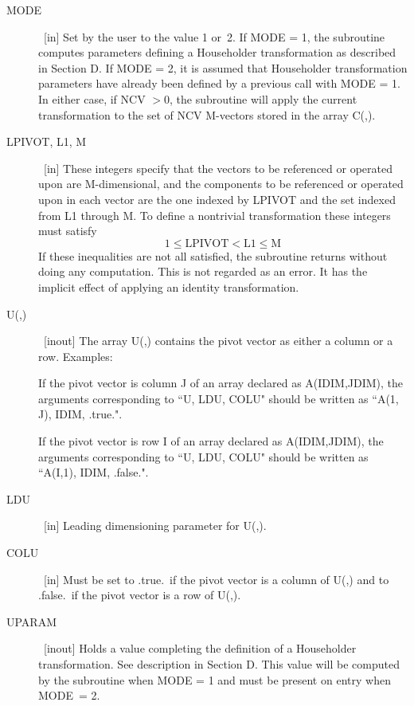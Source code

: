 \documentclass[twoside]{MATH77}
\begin{document}
\begin{description}

\item[MODE] \ [in] Set by the user to the value 1 or~2. If MODE = 1, the subroutine
computes parameters defining a Householder transformation as described in
Section D. If MODE = 2, it is assumed that Householder transformation
parameters have already been defined by a previous call with MODE = 1. In
either case, if NCV $> 0$, the subroutine will apply the current
transformation to the set of NCV M-vectors stored in the array C(,).

\item[LPIVOT, L1, M] \ [in] These integers specify that the vectors to be referenced
or operated upon are M-dimensional, and the components to be referenced or
operated upon in each vector are the one indexed by LPIVOT and the set
indexed from L1 through M. To define a nontrivial transformation these
integers must satisfy
\begin{equation*}
1 \leq \text{LPIVOT} <\text{L1} \leq \text{M}
\end{equation*}
If these inequalities are not all satisfied, the subroutine returns without
doing any computation. This is not regarded as an error. It has the implicit
effect of applying an identity transformation.

\item[U(,)] \ [inout] The array U(,) contains the pivot vector as either a column
or a row. Examples:

If the pivot vector is column J of an array declared as A(IDIM,JDIM), the
arguments corresponding to ``U, LDU, COLU" should be written as ``A(1, J),
IDIM, .true.".

If the pivot vector is row I of an array declared as A(IDIM,JDIM), the
arguments corresponding to ``U, LDU, COLU" should be written as ``A(I,1),
IDIM, .false.".

\item[LDU] \ [in] Leading dimensioning parameter for U(,).

\item[COLU] \ [in] Must be set to .true.\ if the pivot vector is a column of U(,)
and to .false.\ if the pivot vector is a row of U(,).

\item[UPARAM] \ [inout] Holds a value completing the definition of a Householder
transformation. See description in Section D. This value will be computed by
the subroutine when MODE = 1 and must be present on entry when MODE\ = 2.


\end{description}
\end{document}
